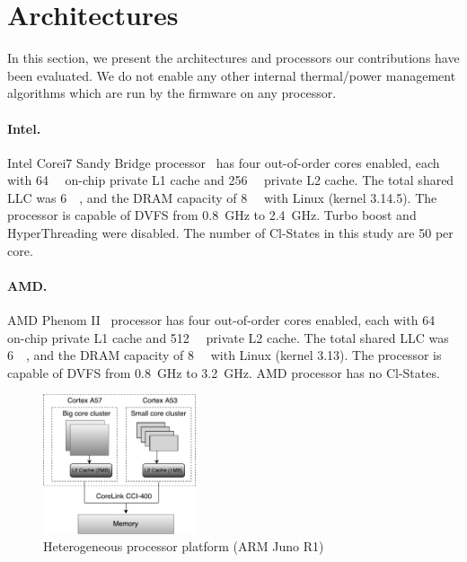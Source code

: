 

\section{Architectures}
\label{sec: architecture}

In this section, we present the architectures and processors our contributions have been
evaluated. We do not enable any other internal thermal/power management algorithms which 
are run by the firmware on any processor.


 \paragraph*{Intel.} Intel Corei7 Sandy Bridge processor~\citep{Intel} has four
out-of-order cores enabled, each with \SI{64}{\Kilo\byte} on-chip private L1 cache and
\SI{256}{\Kilo\byte} private L2 cache. The total shared LLC was \SI{6}{\mega\byte}, and
the DRAM capacity of \SI{8}{\giga\byte} with Linux (kernel 3.14.5). The processor is
capable of DVFS from \SI{0.8}{\giga\hertz} to \SI{2.4}{\giga\hertz}.  Turbo boost and
HyperThreading were disabled.  The number of Cl-States in this study are 50 per
core.  

 \paragraph*{AMD.} AMD Phenom II~\citep{AMD} processor has four out-of-order
cores enabled, each with \SI{64}{\Kilo\byte} on-chip private L1 cache  and
\SI{512}{\Kilo\byte} private L2 cache.  The total shared LLC was \SI{6}{\mega\byte}, and
the DRAM capacity of \SI{8}{\giga\byte} with Linux (kernel 3.13). The processor is capable
of DVFS from \SI{0.8}{\giga\hertz} to \SI{3.2}{\giga\hertz}.  AMD processor has no
Cl-States.  


\begin{figure}[H] \centering
\includegraphics[width=0.4\textwidth]{Chapter2/Figs/Architecture_ARM.pdf}
\caption{Heterogeneous processor platform (ARM Juno R1)} \label{fig: archiarm}
\end{figure}

